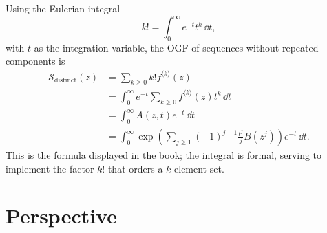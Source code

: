 Using the Eulerian integral
\[
    k! = \int_{0}^{\infty} e^{-t}t^{k}\,\dd t,
\]
with $t$ as the integration variable, the OGF of sequences without repeated components is
\begin{equation*}
    \begin{aligned}
        \mathcal{S}_{\text{distinct}}(z)
            &= \sum_{k \geq 0} k! f^{\langle k \rangle}(z) \\
            &= \int_{0}^{\infty} e^{-t}\sum_{k \geq 0} f^{\langle k \rangle}(z)t^{k}\,\dd t \\
            &= \int_{0}^{\infty} A(z, t)e^{-t}\,\dd t \\
            &= \int_{0}^{\infty}
                \exp\left(\sum_{j \geq 1}(-1)^{j - 1}\frac{t^{j}}{j}B(z^{j})\right)e^{-t}\,\dd t.
    \end{aligned}
\end{equation*}
This is the formula displayed in the book; the integral is formal, serving to implement the
factor $k!$ that orders a $k$-element set.

\section{Perspective}
